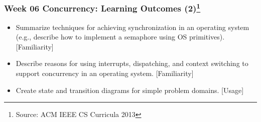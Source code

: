 \begin{frame}[fragile]
\frametitle{Week 06 Concurrency:
Learning Outcomes (2)\footnote{Source: ACM IEEE CS Curricula 2013}}
\begin{itemize}
\item Summarize techniques for achieving synchronization in an operating system (e.g., describe how to implement a semaphore using OS primitives). [Familiarity] 
\item Describe reasons for using interrupts, dispatching, and context switching to support concurrency in an operating system. [Familiarity] 
\item Create state and transition diagrams for simple problem domains. [Usage] 
\end{itemize}
\end{frame}

